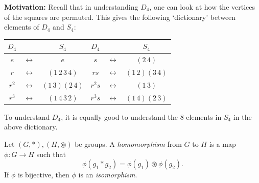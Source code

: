 \noindent \textbf{Motivation:} Recall that in understanding $D_4$, one can look at how the vertices of the squares are permuted. This gives the following `dictionary' between elements of $D_4$ and $S_4$:
\begin{center}
\begin{tabular}{c c c | c c c}
$D_4$ & & $S_4$ & $D_4$ & & $S_4$ \\
\hline
$e$ & $\leftrightarrow$ & $e$ & $s$ & $\leftrightarrow$ & $(2\,4)$ \\
$r$ & $\leftrightarrow$ & $(1\,2\,3\,4)$ & $rs$ & $\leftrightarrow$ & $(1\,2)(3\,4)$ \\
$r^2$ & $\leftrightarrow$ & $(1\,3)(2\,4)$ & $r^2s$ & $\leftrightarrow$ & $(1\,3)$ \\
$r^3$ & $\leftrightarrow$ & $(1\,4\,3\,2)$ & $r^3s$ & $\leftrightarrow$ & $(1\,4)(2\,3)$ \\
\end{tabular}
\end{center}
To understand $D_4$, it is equally good to understand the 8 elements in $S_4$ in the above dictionary.

\begin{definition}
Let $(G, \ast), (H, \circledast)$ be groups. A \textit{homomorphism} from $G$ to $H$ is a map $\phi : G \to H$ such that 
$$\phi(g_1 \ast g_2) = \phi(g_1) \circledast \phi(g_2).$$ 
If $\phi$ is bijective, then $\phi$ is an \textit{isomorphism}. 
\end{definition}

